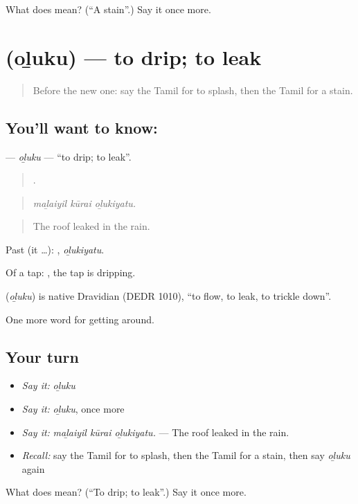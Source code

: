 \begin{tcolorbox}[breakable,colback=teal!4,colframe=teal!35!black,title={Before you move on}]
What does  mean? (\textquotedblleft{}A stain\textquotedblright{}.) Say it once more.
\end{tcolorbox}
\section[\texorpdfstring{\ta{ஒழுகு} (oḻuku)}{ஒழுகு (oḻuku)}]{ (oḻuku) — to drip; to leak}

\label{lesson:TA-C444-oluku}



\begin{quote}
Before the new one: say the Tamil for to splash, then the Tamil for a stain.
\end{quote}

\subsection*{You'll want to know: }
\textbf{} — \emph{oḻuku} — \textquotedblleft{}to drip; to leak\textquotedblright{}.

\begin{quote}
  .
\end{quote}

\begin{quote}
\emph{maḻaiyil kūrai oḻukiyatu.}
\end{quote}

\begin{quote}
The roof leaked in the rain.
\end{quote}

Past (it …): , \emph{oḻukiyatu}.

Of a tap:  , the tap is dripping.

\begin{cousinweb}
\textbf{} (\emph{oḻuku}) is native Dravidian (DEDR 1010), \textquotedblleft{}to flow, to leak, to trickle down\textquotedblright{}.
\end{cousinweb}

\begin{grammarlens}[title={What you've built}]
One more word for getting around.
\end{grammarlens}

\subsection*{Your turn}
\begin{itemize}
\raggedright
  \item \emph{Say it:} \emph{oḻuku}
  \item \emph{Say it:} \emph{oḻuku}, once more
  \item \emph{Say it:} \emph{maḻaiyil kūrai oḻukiyatu.} — The roof leaked in the rain.
  \item \emph{Recall:} say the Tamil for to splash, then the Tamil for a stain, then say \emph{oḻuku} again
\end{itemize}

\begin{tcolorbox}[breakable,colback=teal!4,colframe=teal!35!black,title={Before you move on}]
What does  mean? (\textquotedblleft{}To drip; to leak\textquotedblright{}.) Say it once more.
\end{tcolorbox}

